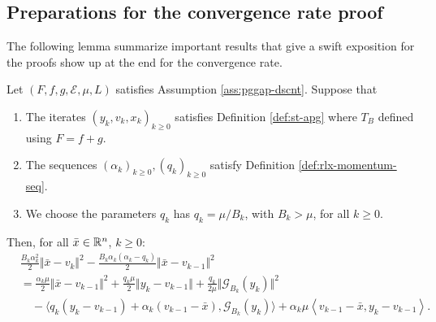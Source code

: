 \documentclass[12pt]{article}
\begin{document}
    \subsection{Preparations for the convergence rate proof}
        The following lemma summarize important results that give a swift exposition for the proofs show up at the end for the convergence rate. 
        \begin{lemma}\label{lemma:cnvg-prep-part1}
            Let $(F, f, g,  \mathcal E, \mu, L)$ satisfies Assumption \ref{ass:pggap-dscnt}. 
            Suppose that 
            \begin{enumerate}[nosep]
                \item The iterates $(y_k, v_k, x_k)_{k \ge 0}$ satisfies Definition \ref{def:st-apg} where $T_B$ defined using $F = f + g$. 
                \item The sequences $(\alpha_k)_{k\ge 0}, (q_k)_{k \ge 0}$ satisfy Definition \ref{def:rlx-momentum-seq}. 
                \item We choose the parameters $q_k$ has $q_k = \mu/B_k$, with $B_k > \mu$, for all $k \ge 0$. 
            \end{enumerate}
            Then, for all $\bar x \in \mathbb R^n$, $k \ge 0$: 
            \begin{align*}
                & \frac{B_k\alpha_k^2}{2}\Vert \bar x - v_k\Vert^2 
                - \frac{B_k\alpha_k(\alpha_k - q_k)}{2}\Vert \bar x - v_{k - 1}\Vert^2
                \\
                &=
                \frac{\alpha_k \mu}{2}
                \Vert \bar x - v_{k - 1}\Vert^2
                + \frac{q_k\mu}{2}\Vert y_k - v_{k - 1} \Vert
                + \frac{q_k}{2\mu}\Vert \mathcal G_{B_k}(y_k)\Vert^2
                \\ &\quad 
                - \langle
                    q_k(y_k - v_{k - 1}) + \alpha_k(v_{k - 1} - \bar x), \mathcal G_{B_k}(y_k)
                \rangle
                    + \alpha_k \mu
                    \left\langle 
                        v_{k - 1} - \bar x, 
                        y_k - v_{k - 1}
                    \right\rangle. 
            \end{align*}
        \end{lemma}
\end{document}
